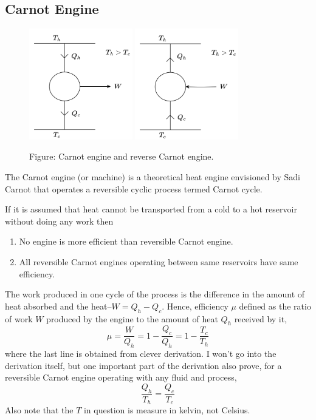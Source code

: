 \documentclass[../../../Main.tex]{subfiles}
\begin{document}
\subsection*{Carnot Engine}
\begin{figure}
    \centering
    \includegraphics[width=0.4\textwidth]{../../../Rss/Themodynamics/KeyConcepts/CarnotEngine.png}
    \includegraphics[width=0.4\textwidth]{../../../Rss/Themodynamics/KeyConcepts/ReverseCarnotEngine.png}
    \caption*{Figure: Carnot engine and reverse Carnot engine.}
\end{figure}
The Carnot engine (or machine) is a theoretical heat engine envisioned by Sadi Carnot that operates a reversible cyclic process termed Carnot cycle.

If it is assumed that heat cannot be transported from a cold to a hot reservoir without doing any work then
\begin{enumerate}
    \item No engine is more efficient than reversible Carnot engine.
    \item All reversible Carnot engines operating between same reservoirs have same efficiency. 
\end{enumerate}

The work produced in one cycle of the process is the difference in the amount of heat absorbed and the heat--$W=Q_h-Q_c$. Hence, efficiency $\mu$ defined as the ratio of work $W$ produced by the engine to the amount of heat $Q_h$ received by it,
\begin{equation*}
    \mu=\frac{W}{Q_h}=1-\frac{Q_c }{Q_h}=1-\frac{T_c}{T_h}
\end{equation*}
where the last line is obtained from clever derivation. I won't go into the derivation itself, but one important part of the derivation also prove, for a reversible Carnot engine operating with any fluid and process, 
\begin{equation*}
    \frac{Q_h}{T_h}=\frac{Q_c}{T_c}
\end{equation*}
Also note that the $T$ in question is measure in kelvin, not Celsius. 
\end{document}
